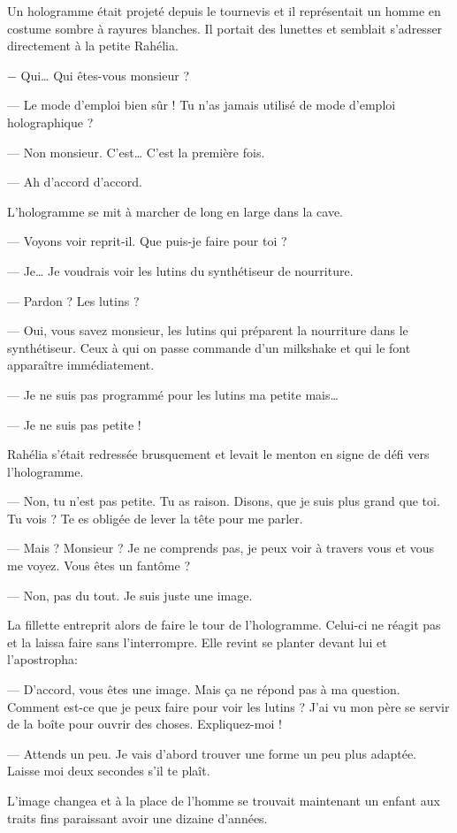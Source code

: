 \documentclass[ebook,12pt,oneside,onecolumn,openright,draft]{memoir}
\begin{document}
Un hologramme était projeté depuis le tournevis et il représentait un homme en
costume sombre à rayures blanches. Il portait des lunettes et semblait
s'adresser directement à la petite Rahélia.

  − Qui… Qui êtes-vous monsieur ?

— Le mode d'emploi bien sûr ! Tu n'as jamais utilisé de mode d'emploi
holographique ?

  — Non monsieur. C'est… C'est la première fois.

  — Ah d'accord d'accord.

L'hologramme se mit à marcher de long en large dans la cave.

  — Voyons voir reprit-il. Que puis-je faire pour toi ?

  — Je… Je voudrais voir les lutins du synthétiseur de nourriture.

  — Pardon ? Les lutins ?

— Oui, vous savez monsieur, les lutins qui préparent la nourriture dans le
synthétiseur. Ceux à qui on passe commande d'un milkshake et qui le font
apparaître immédiatement.

  — Je ne suis pas programmé pour les lutins ma petite mais…

  — Je ne suis pas petite !

Rahélia s'était redressée brusquement et levait le menton en signe de défi vers
l'hologramme.

— Non, tu n'est pas petite. Tu as raison. Disons, que je suis plus grand que
toi. Tu vois ? Te es obligée de lever la tête pour me parler.

— Mais ? Monsieur ? Je ne comprends pas, je peux voir à travers vous et vous me
voyez. Vous êtes un fantôme ?

  — Non, pas du tout. Je suis juste une image.

La fillette entreprit alors de faire le tour de l'hologramme. Celui-ci ne réagit
pas et la laissa faire sans l'interrompre. Elle revint se planter devant lui et
l'apostropha:

— D’accord, vous êtes une image. Mais ça ne répond pas à ma question. Comment
est-ce que je peux faire pour voir les lutins ? J'ai vu mon père se servir de la
boîte pour ouvrir des choses. Expliquez-moi !

— Attends un peu. Je vais d'abord trouver une forme un peu plus adaptée. Laisse
moi deux secondes s'il te plaît.

L'image changea et à la place de l'homme se trouvait maintenant un enfant aux
traits fins paraissant avoir une dizaine d'années.
\end{document}
